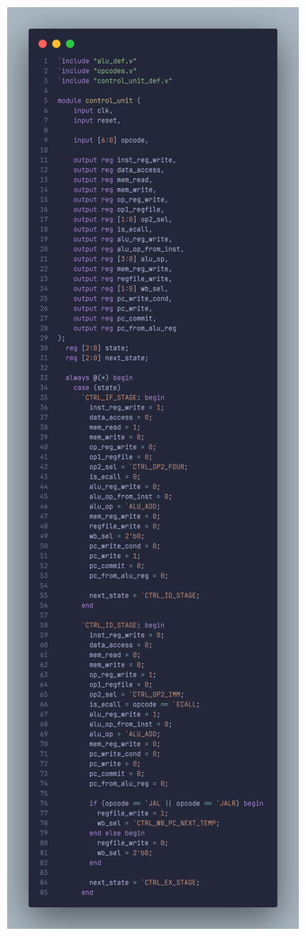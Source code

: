 \documentclass{scrartcl}
\begin{document}
\begin{center}
  \includegraphics[scale=0.15]{code_screenshot/control_unit_1.png}

\end{center}
\end{document}
